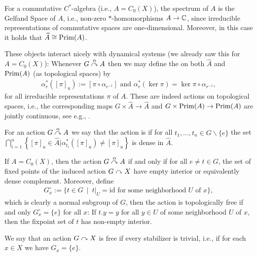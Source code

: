 \begin{remark}
	For a commutative $C^*$-algebra (i.e., $A = C_0(X)$), the spectrum of $A$ is the Gelfand Space of $A$, i.e., non-zero $*$-homomorphisms $A \to \mathbb{C}$, since irreducible representations of commutative spaces are one-dimensional. Moreover, in this case it holds that $\widehat{A} \cong \mathrm{Prim}(A)$.
\end{remark}
These objects interact nicely with dynamical systems (we already saw this for $A= C_0(X)$): Whenever $G \stackrel{\alpha}{\curvearrowright} A$ then we may define the  on both $\hat A$ and $\mathrm{Prim}(A)$ (as topological spaces) by
\begin{align*}
	\alpha_r^*([\pi]_u) := [\pi \circ \alpha_{r^{-1}}] \text{ and } \alpha_{r}^*(\ker \pi) = \ker \pi \circ \alpha_{r^{-1}},
\end{align*}
for all irreducible representations $\pi$ of $A$. These are indeed actions on topological spaces, i.e., the corresponding maps $G \times \hat A \to \hat A$ and $G \times \mathrm{Prim}(A) \to \mathrm{Prim}(A)$ are jointly continuous, see e.g., \cite[Lemma 7.1]{williamsmorita}.
\begin{definition}
	For an action $G \stackrel{\alpha}{\curvearrowright} A$ we say that the action is  if for all $t_1,\dots,t_n \in G\backslash\{e\}$ the set $\bigcap_{i=1}^n \left\{ [\pi]_u \in \hat A | \alpha_{t_i}^*([\pi]_u)\neq [\pi]_u \right\}$ is dense in $\hat A$.
\end{definition}
\begin{remark}
	If $A=C_0(X)$, then the action $G \stackrel{\alpha}{\curvearrowright} A$ if and only if for all $e \neq t \in G$, the set of fixed points of the induced action $G \stackrel{}{\curvearrowright} X$ have empty interior or equivalently dense complement. Moreover, define 
	\begin{align*}
		G_x^\circ := \{t \in G \ \mid \ t|_U = \mathrm{id} \text{ for some neighborhood } U \text{ of } x\},
	\end{align*}
	which is clearly a normal subgroup of $G$, then the action is topologically free if and only $G_x^\circ = \{e\}$ for all $x$: If $t.y= y$ for all $y \in U$ of some neighborhood $U$ of $x$, then the fixpoint set of $t$ has non-empty interior.
\end{remark}
\begin{definition}
	We say that an action $G \stackrel{}{\curvearrowright} X$ is free if every stabilizer is trivial, i.e., if for each $x \in X$ we have $G_x = \{e\}$.
\end{definition}
